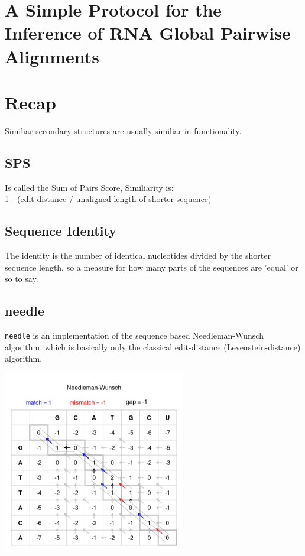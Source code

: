 \documentclass{scrartcl}
\begin{document}
\section*{A Simple Protocol for the Inference of RNA Global Pairwise Alignments}


\section*{Recap}

Similiar secondary structures are usually similiar in functionality.


\subsection*{SPS}
Is called the Sum of Pairs Score, Similiarity is: \\
1 - (edit distance / unaligned length of shorter sequence)

\subsection*{Sequence Identity}
The identity is the number of identical nucleotides divided by the shorter sequence length, so a measure for how many parts of the sequences are 'equal' or so to say.


\subsection*{needle}

\verb!needle! is an implementation of the sequence based Needleman-Wunsch
algorithm, which is basically only the classical edit-distance
(Levenstein-distance) algorithm.

\includegraphics[width=0.6\textwidth]{bioinfI/images/Needleman-Wunsch_pairwise_sequence_alignment}
\end{document}
